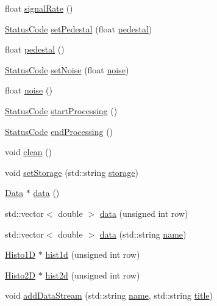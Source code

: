 \begin{DoxyCompactItemize}
\item 
float \hyperlink{classEmulateFE_a98d2e402e4707109ca14ee9f4d95c2fa}{signal\+Rate} ()
\item 
\hyperlink{classStatusCode}{Status\+Code} \hyperlink{classEmulateFE_a6328b50231c29fc5a7e6df99a3db3a29}{set\+Pedestal} (float \hyperlink{classEmulateFE_a8442db97da7b2a97fe97745e6d8d9161}{pedestal})
\item 
float \hyperlink{classEmulateFE_a8442db97da7b2a97fe97745e6d8d9161}{pedestal} ()
\item 
\hyperlink{classStatusCode}{Status\+Code} \hyperlink{classEmulateFE_a9b1d0d30631d304fc615c064db8231ca}{set\+Noise} (float \hyperlink{classEmulateFE_a3e1a2e88567bf16a5599a1602d6ba50d}{noise})
\item 
float \hyperlink{classEmulateFE_a3e1a2e88567bf16a5599a1602d6ba50d}{noise} ()
\item 
\hyperlink{classStatusCode}{Status\+Code} \hyperlink{classProcessus_a09319bde9bed93e290f69b4e04585543}{start\+Processing} ()
\item 
\hyperlink{classStatusCode}{Status\+Code} \hyperlink{classProcessus_a5e4da662989d356b89d490b89c7afbfd}{end\+Processing} ()
\item 
void \hyperlink{classProcessus_aaeb17673b98d2b39f3aa780e335e0968}{clean} ()
\item 
void \hyperlink{classProcessus_ad57a29b33f9021eda9f6929136f1784f}{set\+Storage} (std\+::string \hyperlink{classProcessus_a33fa1a0b54a636e5cdd680669fd9ea51}{storage})
\item 
\hyperlink{classData}{Data} $\ast$ \hyperlink{classProcessus_a16e45f329fbce935aeef0ff3cb508228}{data} ()
\item 
std\+::vector$<$ double $>$ \hyperlink{classProcessus_aa7c57483cf4b9ab0b2d0ae2de8316402}{data} (unsigned int row)
\item 
std\+::vector$<$ double $>$ \hyperlink{classProcessus_abf4d91fb36707e1d50178bab12d21ae9}{data} (std\+::string \hyperlink{classObject_a300f4c05dd468c7bb8b3c968868443c1}{name})
\item 
\hyperlink{classHisto1D}{Histo1D} $\ast$ \hyperlink{classProcessus_a409227db936baff03c0462c1bcfe8069}{hist1d} (unsigned int row)
\item 
\hyperlink{classHisto2D}{Histo2D} $\ast$ \hyperlink{classProcessus_a73b5118cb5f2b5eaad33286183b86cfc}{hist2d} (unsigned int row)
\item 
void \hyperlink{classProcessus_a308c8f193802f1d1ab49d4447d0cb281}{add\+Data\+Stream} (std\+::string \hyperlink{classObject_a300f4c05dd468c7bb8b3c968868443c1}{name}, std\+::string \hyperlink{classObject_a73a0f1a41828fdd8303dd662446fb6c3}{title})

\end{DoxyCompactItemize}
